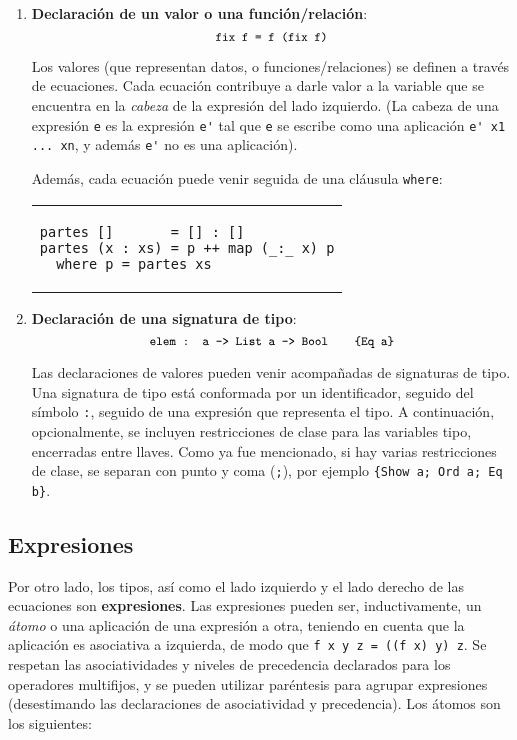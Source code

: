 \begin{enumerate}
  \item {\bf Declaración de un valor o una función/relación}:
      \[ {\small \texttt{fix  f  = f  (fix  f)}} \]

    Los valores (que representan datos, o funciones/relaciones)
    se definen a través de ecuaciones.
    Cada ecuación contribuye a darle valor a la variable que se encuentra en la {\em cabeza}
    de la expresión del lado izquierdo.
    (La cabeza de una expresión \verb|e| es la expresión
    \verb|e'| tal que \verb|e| se escribe como una aplicación
    \verb|e' x1 ... xn|, y además \verb|e'| no es una aplicación).

    Además, cada ecuación puede venir seguida de una cláusula \verb|where|:
      \begin{center}
      \begin{tabular}{l}
      \begin{lstlisting}
partes []       = [] : []
partes (x : xs) = p ++ map (_:_ x) p
  where p = partes xs
      \end{lstlisting}
      \end{tabular}
      \end{center}

  \item {\bf Declaración de una signatura de tipo}:
      \[ {\small \texttt{ elem : a -> List a -> Bool    \ \ \ \{Eq a\} }} \]

    Las declaraciones de valores pueden venir acompañadas de signaturas de tipo.
    Una signatura de tipo está conformada por un identificador, seguido del
    símbolo \verb|:|, seguido de una expresión que representa el tipo.
    A continuación, opcionalmente, se incluyen restricciones de clase
    para las variables tipo, encerradas entre llaves.
    Como ya fue mencionado, si hay varias restricciones de clase,
    se separan con punto y coma (\verb|;|), por ejemplo \verb|{Show a; Ord a; Eq b}|.
\end{enumerate}

\subsection{Expresiones}

Por otro lado, los tipos, así como el lado izquierdo y el lado derecho
de las ecuaciones son {\bf expresiones}.
Las expresiones pueden ser, inductivamente, un {\em átomo}
o una aplicación de una expresión a otra,
teniendo en cuenta que la aplicación es asociativa a izquierda,
de modo que \verb|f x y z = ((f x) y) z|.
Se respetan las asociatividades y niveles de precedencia declarados para
los operadores multifijos, y se pueden utilizar paréntesis para agrupar
expresiones (desestimando las declaraciones de asociatividad y precedencia).
Los átomos son los siguientes:

